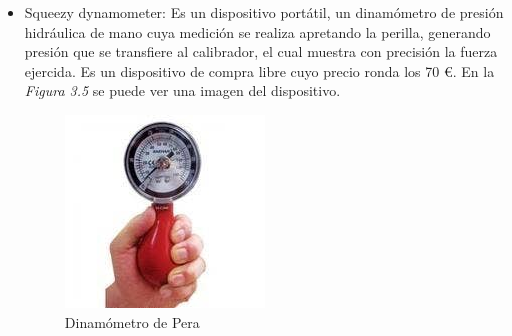 \begin{itemize}
    \item Squeezy dynamometer: Es un dispositivo portátil, un dinamómetro de presión hidráulica de mano cuya medición se realiza apretando la perilla, generando presión que se transfiere al calibrador, el cual muestra con precisión la fuerza ejercida. Es un dispositivo de compra libre cuyo precio ronda los 70 €. En la \textit{Figura 3.5} se puede ver una imagen del dispositivo.
    \begin{figure}[h]
        \centering
        \includegraphics[width=0.5\textwidth]{img/Dinamometro pera.jpeg}
        \caption{Dinamómetro de Pera}
        \label{fig:activforce}
    \end{figure}
\end{itemize}
